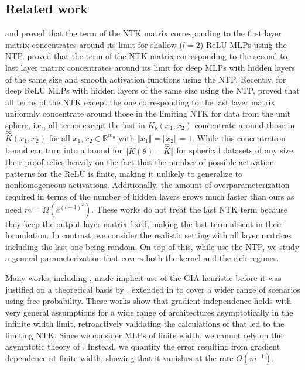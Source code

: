 \documentclass[twoside,11pt]{article}
\newcommand{\R}{\mathbb{R}}
\newcommand{\limiting}[1]{\overset{\scriptscriptstyle\infty}{#1}}
\begin{document}
\subsection{Related work}\label{related}

\citet{Duetal2018} and \citet{Suetal2019} proved that the term of the NTK matrix corresponding to the first layer matrix concentrates around its limit for shallow ($l=2$) ReLU MLPs using the NTP. \citet{Duetal2019} proved that the term of the NTK matrix corresponding to the second-to-last layer matrix concentrates around its limit for deep MLPs with hidden layers of the same size and smooth activation functions using the NTP. Recently, for deep ReLU MLPs with hidden layers of the same size using the NTP, \citet{Xuetal2024} proved that all terms of the NTK except the one corresponding to the last layer matrix uniformly concentrate around those in the limiting NTK for data from the unit sphere, i.e., all terms except the last in $K_\theta(x_1,x_2)$ concentrate around those in $\limiting{K}(x_1,x_2)$ for all $x_1,x_2 \in \R^{m_0}$ with $\Vert x_1 \Vert = \Vert x_2 \Vert = 1$. While this concentration bound can turn into a bound for $\Vert K(\theta)-\limiting{K} \Vert$ for spherical datasets of any size, their proof relies heavily on the fact that the number of possible activation patterns for the ReLU is finite, making it unlikely to generalize to nonhomogeneous activations. Additionally, the amount of overparameterization required in terms of the number of hidden layers grows much faster than ours as \citet{Xuetal2024} need $m = \Omega(e^{(l-1)^2})$. These works do not treat the last NTK term because they keep the output layer matrix fixed, making the last term absent in their formulation. In contrast, we consider the realistic setting with all layer matrices including the last one being random. On top of this, while \citet{Duetal2018, Suetal2019, Duetal2019, Xuetal2024} use the NTP, we study a general parameterization that covers both the kernel and the rich regimes.

Many works, including \citet{Jacotetal2018}, made implicit use of the GIA heuristic before it was justified on a theoretical basis by \citet{Yang2020}, extended in \citet{Yang2021} to cover a wider range of scenarios using free probability. These works show that gradient independence holds with very general assumptions for a wide range of architectures asymptotically in the infinite width limit, retroactively validating the calculations of \citet{Jacotetal2018} that led to the limiting NTK. Since we consider MLPs of finite width, we cannot rely on the asymptotic theory of \citet{Yang2020, Yang2021}. Instead, we quantify the error resulting from gradient dependence at finite width, showing that it vanishes at the rate $O(m^{-1})$.
\end{document}
